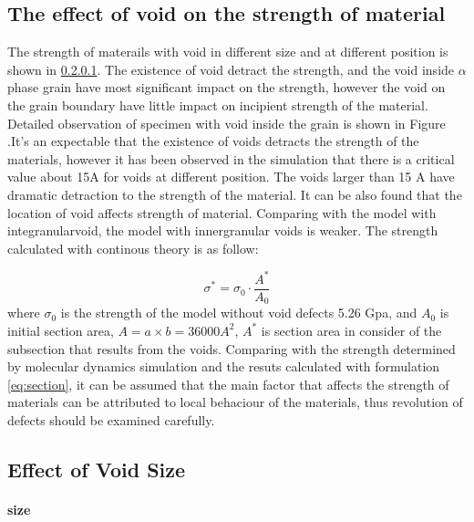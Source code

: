 \documentclass[times,12pt]{elsarticle}
\begin{document}
\subsection{The effect of void on the strength of material}
The strength of materails with void in different size and at different position is shown in \ref{}. The existence of void detract the strength, and the void inside $\alpha$ phase grain have most significant  impact on the strength, however the void on the grain boundary have little impact on incipient strength of the material. Detailed observation of specimen with void inside the grain is shown in Figure \cite{}.It's an expectable that the existence of voids detracts the strength of the materials, however it has been observed in the simulation that there is a critical value about 15A for voids at different position. The voids larger than 15 A have dramatic detraction to the strength of the material. It can be also found that the location of void affects strength of material. Comparing with the model with integranularvoid, the model with innergranular voids is weaker. The strength calculated with continous theory is as follow:

\begin{equation} \label{eq:section} 
\sigma^* = \sigma_0 \cdot \frac{A^*}{A_0}
\end{equation}
where $\sigma_0$ is the strength of the model without void defects 5.26 Gpa, and $A_0$ is initial section area, $ A = a\times b = 36000 A^2$, $A^* $ is section area in consider of the subsection that results from the voids.
Comparing with the strength determined by molecular dynamics simulation and the resuts calculated with formulation \ref{eq:section}, it can be assumed that the main factor that affects the strength of materials can be attributed to local behaciour of the materials, thus revolution of defects should be examined carefully. 
 
\subsection{Effect of Void Size}
\paragraph{size}
\end{document}

